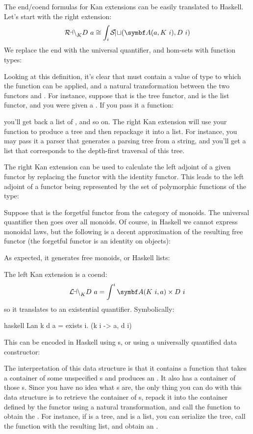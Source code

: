 The end/coend formulas for Kan extensions can be easily translated to
Haskell. Let's start with the right extension:
\[\Ran_{K}D\ a \cong \int_i \Set(\cat{A}(a, K\ i), D\ i)\]
We replace the end with the universal quantifier, and hom-sets with
function types:

Looking at this definition, it's clear that  must contain a
value of type  to which the function can be applied, and a
natural transformation between the two functors  and
. For instance, suppose that  is the tree functor,
and  is the list functor, and you were given a
. If you pass it a function:

you'll get back a list of , and so on. The right Kan
extension will use your function to produce a tree and then repackage it
into a list. For instance, you may pass it a parser that generates a
parsing tree from a string, and you'll get a list that corresponds to
the depth-first traversal of this tree.

The right Kan extension can be used to calculate the left adjoint of a
given functor by replacing the functor  with the identity
functor. This leads to the left adjoint of a functor  being
represented by the set of polymorphic functions of the type:

Suppose that  is the forgetful functor from the category of
monoids. The universal quantifier then goes over all monoids. Of course,
in Haskell we cannot express monoidal laws, but the following is a
decent approximation of the resulting free functor (the forgetful
functor  is an identity on objects):

As expected, it generates free monoids, or Haskell lists:

The left Kan extension is a coend:
\[\Lan_{K}D\ a = \int^i \cat{A}(K\ i, a)\times{}D\ i\]
so it translates to an existential quantifier. Symbolically:

\begin{snip}{haskell}
Lan k d a = exists i. (k i -> a, d i)
\end{snip}
This can be encoded in Haskell using s, or using a universally
quantified data constructor:

The interpretation of this data structure is that it contains a function
that takes a container of some unspecified s and produces an
. It also has a container of those s. Since you have
no idea what s are, the only thing you can do with this data
structure is to retrieve the container of s, repack it into
the container defined by the functor  using a natural
transformation, and call the function to obtain the . For
instance, if  is a tree, and  is a list, you can
serialize the tree, call the function with the resulting list, and
obtain an .

